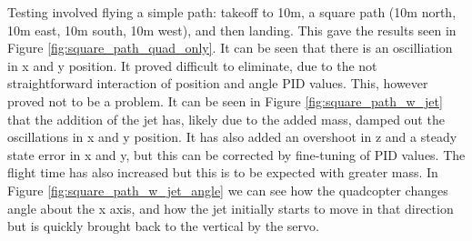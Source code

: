 \documentclass[11pt]{article}
\begin{document}
Testing involved flying a simple path: takeoff to 10m, a square path (10m north, 10m east, 10m south, 10m west), and then landing. This gave the results seen in Figure \ref{fig:square_path_quad_only}. It can be seen that there is an oscilliation in x and y position. It proved difficult to eliminate, due to the not straightforward interaction of position and angle PID values. This, however proved not to be a problem. It can be seen in Figure \ref{fig:square_path_w_jet} that the addition of the jet has, likely due to the added mass, damped out the oscillations in x and y position. It has also added an overshoot in z and a steady state error in x and y, but this can be corrected by fine-tuning of PID values. The flight time has also increased but this is to be expected with greater mass. In Figure \ref{fig:square_path_w_jet_angle} we can see how the quadcopter changes angle about the x axis, and how the jet initially starts to move in that direction but is quickly brought back to the vertical by the servo.
\end{document}
